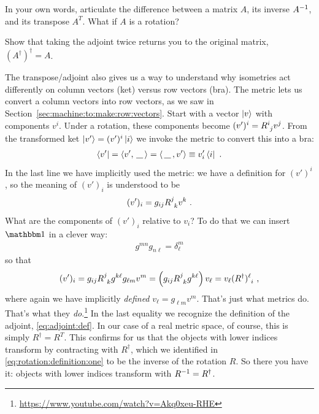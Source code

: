 \documentclass[12pt]{article}
\begin{document}
\begin{exercise}
In your own words, articulate the difference between a matrix $A$, its inverse $A^{-1}$, and its transpose $A^T$. What if $A$ is a rotation?
\end{exercise}

\begin{exercise}
Show that taking the adjoint twice returns you to the original matrix, $(A^\dag)^\dag = A$.
\end{exercise}

\begin{example}
The transpose/adjoint also gives us a way to understand why isometries act differently on column vectors (ket) versus row vectors (bra). The metric lets us convert a column vectors into row vectors, as we saw in Section~\ref{sec:machine:to:make:row:vectors}. Start with a vector $\left|v\right\rangle$ with components $v^i$. Under a rotation, these components become $(v')^i = R\aij{i}{j}v^j$. From the transformed ket $\left|v'\right\rangle = (v')^i \left|i\right\rangle$ we invoke the metric to convert this into a bra:
\begin{align}
\bra{v'} = \la v', \smallslot \ra = \la \smallslot, v' \ra \equiv v'_i \bra{i} \ .    
\end{align}
In the last line we have implicitly used the metric: we have a definition for $(v')^i$, so the meaning of $(v')_i$
is understood to be
\begin{align}
    (v')_i = g_{ij} R\aij{j}{k}v^k \ .
\end{align}
What are the components of $(v')_i$ relative to $v_i$? To do that we can insert $\one$ in a clever way:
\begin{align}
    g^{mn}g_{n\ell} = \delta^m_\ell
\end{align}
so that 
\begin{align}
    (v')_i = g_{ij} R\aij{j}{k} g^{k\ell}g_{\ell m} v^m
    = 
    \left(g_{ij} R\aij{j}{k} g^{k\ell}\right)
    v_\ell
    = 
    v_\ell(R^\dag)\aij{\ell}{i} 
    \ ,
\end{align}
where again we have implicitly \emph{defined} $v_\ell = g_{\ell m}v^m$. That's just what metrics do. That's what they \emph{do}.\footnote{\url{https://www.youtube.com/watch?v=Akq0xeu-RHE}} In the last equality we recognize the definition of the adjoint, \eqref{eq:adjoint:def}. In our case of a real metric space, of course, this is simply $R^\dag = R^T$. This confirms for us that the objects with lower indices transform by contracting with $R^\dag$, which we identified in \eqref{eq:rotation:definition:one} to be the inverse of the rotation $R$. So there you have it: objects with lower indices transform with $R^{-1} = R^\dag$. 


\end{example}
\end{document}
